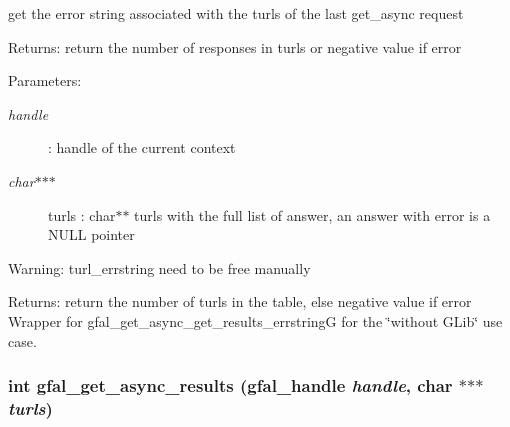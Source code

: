 get the error string associated with the turls of the last get\_\-async request \begin{Desc}
\item[Returns:]return the number of responses in turls or negative value if error \end{Desc}
\begin{Desc}
\item[Parameters:]
\begin{description}
\item[{\em handle}]: handle of the current context \item[{\em char$\ast$$\ast$$\ast$}]turls : char$\ast$$\ast$ turls with the full list of answer, an answer with error is a NULL pointer \end{description}
\end{Desc}
\begin{Desc}
\item[Warning:]turl\_\-errstring need to be free manually \end{Desc}
\begin{Desc}
\item[Returns:]return the number of turls in the table, else negative value if error Wrapper for gfal\_\-get\_\-async\_\-get\_\-results\_\-errstring\-G for the \char`\"{}without GLib\char`\"{} use case. \end{Desc}
\subsubsection{\setlength{\rightskip}{0pt plus 5cm}int gfal\_\-get\_\-async\_\-results (gfal\_\-handle {\em handle}, char $\ast$$\ast$$\ast$ {\em turls})}\label{gfal__common__interface_8c_0c654545b837b8e1928842ee762ce5e9}


